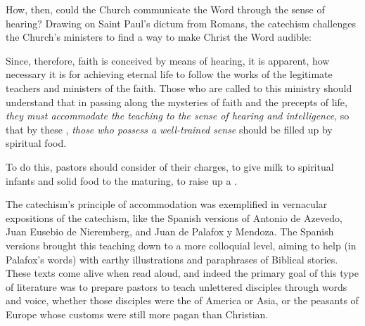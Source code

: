 How, then, could the Church communicate the Word through the sense of hearing?
Drawing on Saint Paul's dictum from Romans, the catechism challenges the Church's
ministers to find a way to make Christ the Word audible:
\begin{quoting}
    Since, therefore, faith is conceived by means of hearing, it is apparent,
    how necessary it is for achieving eternal life to follow the works of the
    legitimate teachers and ministers of the faith. \Dots{} Those who are called
    to this ministry should understand that in passing along the mysteries of
    faith and the precepts of life, \emph{they must accommodate the teaching to
    the sense of hearing and intelligence}, so that by these , \emph{those who possess a well-trained sense} should be filled up
    by spiritual food.%
        \Autocite[2, 8--9 (emphasis added)]{Catholic:Catechismus1614}
\end{quoting}
To do this, pastors should consider  of their charges, to give milk to
spiritual infants and solid food to the maturing, to raise up a .%
    \Autocite[8]{Catholic:Catechismus1614}

The catechism's principle of accommodation was exemplified in vernacular
expositions of the catechism, like the Spanish versions of Antonio de Azevedo,
Juan Eusebio de Nieremberg, and Juan de Palafox y Mendoza.%
    \Autocites{Azevedo:Catecismo}{Nieremberg:PracticaCatecismo}{Palafox:Bocados}
The Spanish versions brought this teaching down to a more colloquial level,
aiming to help  (in Palafox's words) with
earthy illustrations and paraphrases of Biblical stories.
These texts come alive when read aloud, and indeed the primary goal of this type
of literature was to prepare pastors to teach unlettered disciples through words
and voice, whether those disciples were the  of America or Asia,
or the peasants of Europe whose customs were still more pagan than Christian.%
    \Autocite
    [On Europe as a mission front after Trent, see][60--63]
    {Kamen:EarlyModernSociety}

